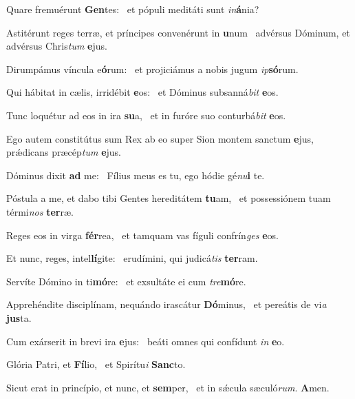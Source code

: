 \item Quare fremuérunt \textbf{Gen}tes:~\psstar{} et pópuli meditáti sunt \textit{in}\textbf{á}nia?
\item Astitérunt reges terræ, et príncipes convenérunt in \textbf{u}num~\psstar{} advérsus Dóminum, et advérsus Chris\textit{tum} \textbf{e}jus.
\item Dirumpámus víncula e\textbf{ó}rum:~\psstar{} et projiciámus a nobis jugum \textit{ip}\textbf{só}rum.
\item Qui hábitat in cælis, irridébit \textbf{e}os:~\psstar{} et Dóminus subsanná\textit{bit} \textbf{e}os.
\item Tunc loquétur ad eos in ira \textbf{su}a,~\psstar{} et in furóre suo conturbá\textit{bit} \textbf{e}os.
\item Ego autem constitútus sum Rex ab eo super Sion montem sanctum \textbf{e}jus,~\psstar{} prǽdicans præcép\textit{tum} \textbf{e}jus.
\item Dóminus dixit \textbf{ad} me:~\psstar{} Fílius meus es tu, ego hódie gé\textit{nu}\textbf{i} te.
\item Póstula a me, et dabo tibi Gentes hereditátem \textbf{tu}am,~\psstar{} et possessiónem tuam térmi\textit{nos} \textbf{ter}ræ.
\item Reges eos in virga \textbf{fér}rea,~\psstar{} et tamquam vas fíguli confrín\textit{ges} \textbf{e}os.
\item Et nunc, reges, intel\textbf{lí}gite:~\psstar{} erudímini, qui judicá\textit{tis} \textbf{ter}ram.
\item Servíte Dómino in ti\textbf{mó}re:~\psstar{} et exsultáte ei cum \textit{tre}\textbf{mó}re.
\item Apprehéndite disciplínam, nequándo irascátur \textbf{Dó}minus,~\psstar{} et pereátis de vi\textit{a} \textbf{jus}ta.
\item Cum exárserit in brevi ira \textbf{e}jus:~\psstar{} beáti omnes qui confídunt \textit{in} \textbf{e}o.
\item Glória Patri, et \textbf{Fí}lio,~\psstar{} et Spirítu\textit{i} \textbf{Sanc}to.
\item Sicut erat in princípio, et nunc, et \textbf{sem}per,~\psstar{} et in sǽcula sæculó\textit{rum}. \textbf{A}men.
